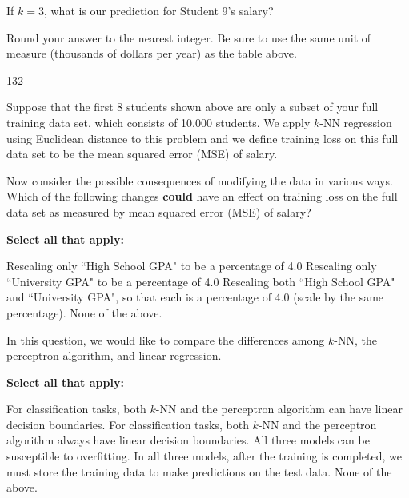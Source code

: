 \documentclass[11pt,addpoints,answers]{exam}
\numberwithin{equation}{section} %
\numberwithin{figure}{section} %
\numberwithin{table}{section} %
\begin{document}
\begin{questions}
    If $k=3$, what is our prediction for Student 9's salary?
    
    Round your answer to the nearest integer. Be sure to use the same unit of measure (thousands of dollars per year) as the table above.
    
    \begin{tcolorbox}[fit,height=1cm, width=4cm, blank, borderline={1pt}{-2pt},nobeforeafter, top=2pt, left=2pt, right=2pt, bottom=2pt]
	    132
    \end{tcolorbox}
    
    

\newpage
    \question[3] Suppose that the first 8 students shown above are only a subset of your full training data set, which consists of 10,000 students. We apply $k$-NN regression using Euclidean distance to this problem and we define training loss on this full data set to be the mean squared error (MSE) of salary.

    Now consider the possible consequences of modifying the data in various ways. Which of the following changes \textbf{could} have an effect on training loss on the full data set as measured by mean squared error (MSE) of salary?
    
    
        
    \textbf{Select all that apply:}
    {
    \checkboxchar{$\Box$} \checkedchar{$\blacksquare$}
    \begin{checkboxes}
        \CorrectChoice Rescaling only ``High School GPA" to be a percentage of 4.0
        \CorrectChoice Rescaling only ``University GPA" to be a percentage of 4.0
        \choice Rescaling both ``High School GPA" and ``University GPA", so that each is a percentage of 4.0 (scale by the same percentage).
        \choice None of the above.
    \end{checkboxes}
    }

    
    
    \question[2] In this question, we would like to compare the differences among $k$-NN, the perceptron algorithm, and linear regression.
    
    {
    \checkboxchar{$\Box$} \checkedchar{$\blacksquare$}
    \textbf{Select all that apply:}
    \begin{checkboxes}
        \CorrectChoice For classification tasks, both $k$-NN and the perceptron algorithm can have linear decision boundaries.
        \choice For classification tasks, both $k$-NN and the perceptron algorithm always have linear decision boundaries.
        \CorrectChoice All three models can be susceptible to overfitting.
        \choice In all three models, after the training is completed, we must store the training data to make predictions on the test data.
        \choice None of the above.
    \end{checkboxes}
    }


\end{questions}
\end{document}
